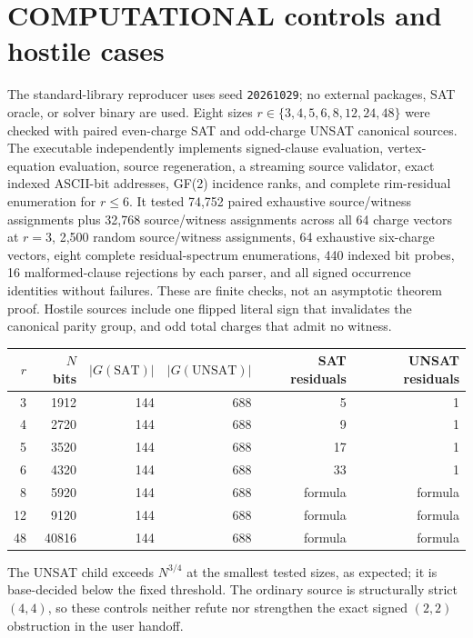 \documentclass[11pt]{article}
\begin{document}
\section{COMPUTATIONAL controls and hostile cases}
The standard-library reproducer uses seed \texttt{20261029}; no external packages, SAT oracle, or solver binary are used. Eight sizes $r\in\{3,4,5,6,8,12,24,48\}$ were checked with paired even-charge SAT and odd-charge UNSAT canonical sources. The executable independently implements signed-clause evaluation, vertex-equation evaluation, source regeneration, a streaming source validator, exact indexed ASCII-bit addresses, GF(2) incidence ranks, and complete rim-residual enumeration for $r\le6$. It tested 74,752 paired exhaustive source/witness assignments plus 32,768 source/witness assignments across all 64 charge vectors at $r=3$, 2,500 random source/witness assignments, 64 exhaustive six-charge vectors, eight complete residual-spectrum enumerations, 440 indexed bit probes, 16 malformed-clause rejections by each parser, and all signed occurrence identities without failures. These are finite checks, not an asymptotic theorem proof. Hostile sources include one flipped literal sign that invalidates the canonical parity group, and odd total charges that admit no witness.

\begin{center}\begin{tabular}{rrrrrr}\toprule
$r$ & $N$ bits & $|G(\mathrm{SAT})|$ & $|G(\mathrm{UNSAT})|$ & SAT residuals & UNSAT residuals\\\midrule
3 & 1912 & 144 & 688 & 5 & 1\\
4 & 2720 & 144 & 688 & 9 & 1\\
5 & 3520 & 144 & 688 & 17 & 1\\
6 & 4320 & 144 & 688 & 33 & 1\\
8 & 5920 & 144 & 688 & formula & formula\\
12 & 9120 & 144 & 688 & formula & formula\\
48 & 40816 & 144 & 688 & formula & formula\\\bottomrule\end{tabular}\end{center}
The UNSAT child exceeds $N^{3/4}$ at the smallest tested sizes, as expected; it is base-decided below the fixed threshold. The ordinary source is structurally strict $(4,4)$, so these controls neither refute nor strengthen the exact signed $(2,2)$ obstruction in the user handoff.
\end{document}
